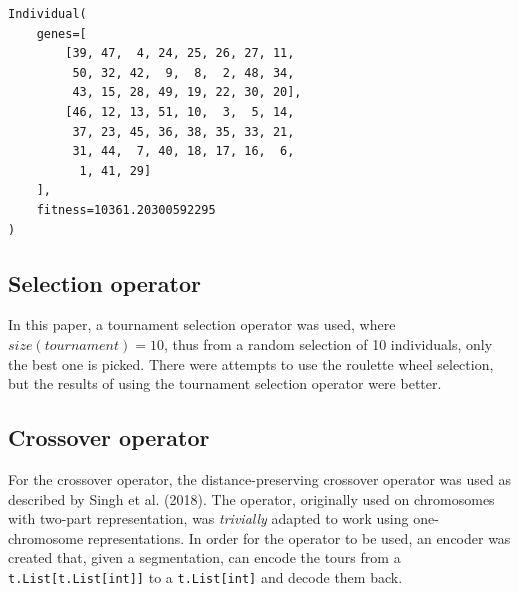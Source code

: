 \documentclass[conference]{IEEEtran}
\begin{document}
\begin{lstlisting}[caption=Example of individual,captionpos=b]
Individual(
    genes=[
        [39, 47,  4, 24, 25, 26, 27, 11,
         50, 32, 42,  9,  8,  2, 48, 34,
         43, 15, 28, 49, 19, 22, 30, 20],
        [46, 12, 13, 51, 10,  3,  5, 14,
         37, 23, 45, 36, 38, 35, 33, 21,
         31, 44,  7, 40, 18, 17, 16,  6,
          1, 41, 29]
    ],
    fitness=10361.20300592295
)
\end{lstlisting} 

\subsection{Selection operator}
In this paper, a tournament selection operator was used, where $size(tournament) = 10$, thus from a random selection of 10
individuals, only the best one is picked. There were attempts to use the roulette wheel selection, but the results of using
the tournament selection operator were better.

\subsection{Crossover operator}
For the crossover operator, the distance-preserving crossover operator was used as described by Singh et al. (2018). The operator,
originally used on chromosomes with two-part representation, was \textit{trivially} adapted to work using one-chromosome
representations. In order for the operator to be used, an encoder was created that, given a segmentation, can encode the
tours from a \texttt{t.List[t.List[int]]} to a \texttt{t.List[int]} and decode them back.
\end{document}
